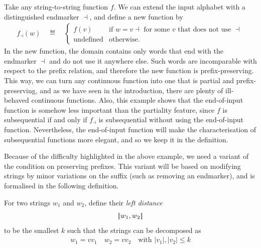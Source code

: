 \begin{myexample}[Endmarkers] \label{ex:endmarker} Take any string-to-string function $f$. We can  extend the input alphabet with a distinguished endmarker $\dashv$, and define a new function by 
\begin{align*}
f_\dashv(w) \quad \eqdef \quad
\begin{cases}
    f(v) & \text{if $w = v\dashv$ for some $v$ that does not use $\dashv$}\\
    \text{undefined} & \text{otherwise}.
\end{cases}
\end{align*}
In the new function, the domain contains only words that end with the endmarker $\dashv$ and do not use it anywhere else. Such words are incomparable with respect to the prefix relation, and therefore the new function is prefix-preserving. This way, we can turn any continuous function into one that is partial and prefix-preserving, and as we have seen in the introduction, there are plenty of ill-behaved continuous functions. Also, this example shows that the end-of-input function is somehow less important than the partiality feature, since $f$ is subsequential if and only if $f_\dashv$ is subsequential without using the end-of-input function. Nevertheless, the end-of-input function will make the characterisation of subsequential functions more elegant, and so we keep it in the definition.
\end{myexample}

Because of the difficulty highlighted in the above example, we need a variant of the condition on preserving prefixes. This variant will be based on modifying strings by minor variations on the suffix (such as removing an endmarker), and is formalised in the following definition.



\begin{definition}\label{def:left-distance}
   For two strings $w_1$ and $w_2$, define their \emph{left distance} 
    \begin{align*}
    |\!|  w_1, w_2 |\!|
    \end{align*}
    to be the smallest $k$ such that the strings can be decomposed as 
    \begin{align*}
    w_1 = v v_1 \quad w_2 = v v_2 \quad \text{with $|v_1|,|v_2| \leq k$}
    \end{align*}
\end{definition}

